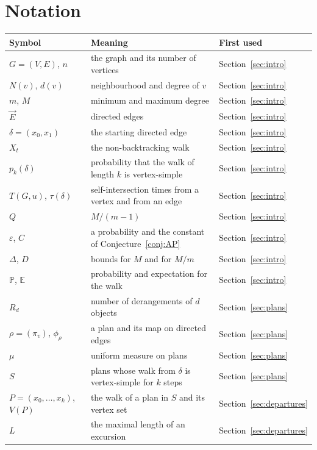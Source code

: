 \documentclass[11pt]{amsart}
\theoremstyle{remark}
\newcommand{\PP}{\mathbb{P}}
\newcommand{\E}{\mathbb{E}}
\newcommand{\vE}{\vec{E}}
\begin{document}
\appendix
\section{Notation}\label{app:notation}

\begin{center}
\small
\begin{tabular}{lll}
\toprule
Symbol & Meaning & First used\\
\midrule
$G=(V,E)$, $n$ & the graph and its number of vertices & Section~\ref{sec:intro}\\
$N(v)$, $d(v)$ & neighbourhood and degree of $v$ & Section~\ref{sec:intro}\\
$m$, $M$ & minimum and maximum degree & Section~\ref{sec:intro}\\
$\vE$ & directed edges & Section~\ref{sec:intro}\\
$\delta=(x_0,x_1)$ & the starting directed edge & Section~\ref{sec:intro}\\
$X_t$ & the non-backtracking walk & Section~\ref{sec:intro}\\
$p_k(\delta)$ & probability that the walk of length $k$ is vertex-simple & Section~\ref{sec:intro}\\
$T(G,u)$, $\tau(\delta)$ & self-intersection times from a vertex and from an edge & Section~\ref{sec:intro}\\
$Q$ & $M/(m-1)$ & Section~\ref{sec:intro}\\
$\varepsilon$, $C$ & a probability and the constant of Conjecture~\ref{conj:AP} & Section~\ref{sec:intro}\\
$\Delta$, $D$ & bounds for $M$ and for $M/m$ & Section~\ref{sec:intro}\\
$\PP$, $\E$ & probability and expectation for the walk & Section~\ref{sec:intro}\\
$R_d$ & number of derangements of $d$ objects & Section~\ref{sec:plans}\\
$\rho=(\pi_v)$, $\phi_\rho$ & a plan and its map on directed edges & Section~\ref{sec:plans}\\
$\mu$ & uniform measure on plans & Section~\ref{sec:plans}\\
$S$ & plans whose walk from $\delta$ is vertex-simple for $k$ steps & Section~\ref{sec:plans}\\
$P=(x_0,\dots,x_k)$, $V(P)$ & the walk of a plan in $S$ and its vertex set & Section~\ref{sec:departures}\\
$L$ & the maximal length of an excursion & Section~\ref{sec:departures}\\

\end{tabular}
\end{center}
\end{document}
